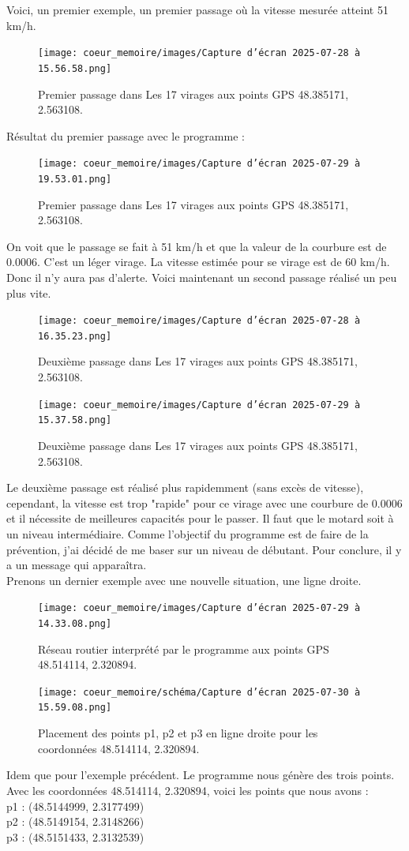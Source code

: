 Voici, un premier exemple, un premier passage où la vitesse mesurée atteint 51 km/h.
\begin{figure}[H]
    \centering
    \texttt{[image: coeur\_memoire/images/Capture d’écran 2025-07-28 à 15.56.58.png]} 
    \caption{Premier passage dans Les 17 virages aux points GPS 48.385171, 2.563108.}
\end{figure}

Résultat du premier passage avec le programme :
\begin{figure}[H]
    \centering
    \texttt{[image: coeur\_memoire/images/Capture d’écran 2025-07-29 à 19.53.01.png]} 
    \caption{Premier passage dans Les 17 virages aux points GPS 48.385171, 2.563108.}
\end{figure}
On voit que le passage se fait à 51 km/h et que la valeur de la courbure est de 0.0006. C'est un léger virage. La vitesse estimée pour se virage est de 60 km/h. Donc il n'y aura pas d'alerte. Voici maintenant un second passage réalisé un peu plus vite.
\begin{figure}[H]
    \centering
    \texttt{[image: coeur\_memoire/images/Capture d’écran 2025-07-28 à 16.35.23.png]} 
    \caption{Deuxième passage dans Les 17 virages aux points GPS 48.385171, 2.563108.}
\end{figure}

\begin{figure}[H]
    \centering
    \texttt{[image: coeur\_memoire/images/Capture d’écran 2025-07-29 à 15.37.58.png]} 
    \caption{Deuxième passage dans Les 17 virages aux points GPS  48.385171, 2.563108.}
\end{figure}

Le deuxième passage est réalisé plus rapidemment (sans excès de vitesse), cependant, la vitesse est trop "rapide" pour ce virage avec une courbure de 0.0006 et il nécessite de meilleures capacités pour le passer. Il faut que le motard soit à un niveau intermédiaire. Comme l'objectif du programme est de faire de la prévention, j'ai décidé de me baser sur un niveau de débutant. Pour conclure, il y a un message qui apparaîtra.\\
Prenons un dernier exemple avec une nouvelle situation, une ligne droite.
\begin{figure}[H]
    \centering
    \texttt{[image: coeur\_memoire/images/Capture d’écran 2025-07-29 à 14.33.08.png]} 
    \caption{Réseau routier interprété par le programme aux points GPS 48.514114, 2.320894.}
\end{figure}
\begin{figure}[H]
    \centering
    \texttt{[image: coeur\_memoire/schéma/Capture d’écran 2025-07-30 à 15.59.08.png]} 
    \caption{Placement des points p1, p2 et p3 en ligne droite pour les coordonnées 48.514114, 2.320894.}
\end{figure}
Idem que pour l'exemple précédent. Le programme nous génère des trois points. Avec les coordonnées 48.514114, 2.320894, voici les points que nous avons :\\
p1 : (48.5144999, 2.3177499)\\
p2 : (48.5149154, 2.3148266)\\
p3 : (48.5151433, 2.3132539)\\

